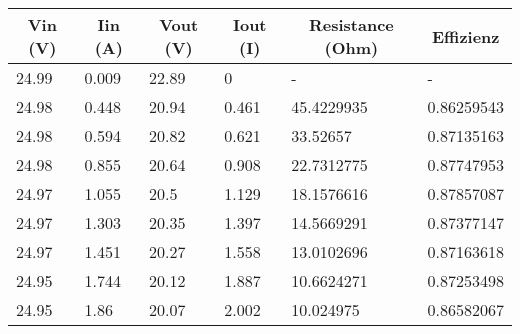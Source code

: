 \begin{table}[h]
\centering

\begin{tabular}{|l|l|l|l|l|l|}
\hline
\multicolumn{1}{|c|}{Vin (V)} & \multicolumn{1}{c|}{Iin (A)} & \multicolumn{1}{c|}{Vout (V)} & \multicolumn{1}{c|}{Iout (I)} & \multicolumn{1}{c|}{Resistance (Ohm)} & \multicolumn{1}{c|}{Effizienz} \\ \hline
24.99                         & 0.009                        & 22.89                         & 0                             & -                                     & -                              \\ \hline
24.98                         & 0.448                        & 20.94                         & 0.461                         & 45.4229935                            & 0.86259543                     \\ \hline
24.98                         & 0.594                        & 20.82                         & 0.621                         & 33.52657                              & 0.87135163                     \\ \hline
24.98                         & 0.855                        & 20.64                         & 0.908                         & 22.7312775                            & 0.87747953                     \\ \hline
24.97                         & 1.055                        & 20.5                          & 1.129                         & 18.1576616                            & 0.87857087                     \\ \hline
24.97                         & 1.303                        & 20.35                         & 1.397                         & 14.5669291                            & 0.87377147                     \\ \hline
24.97                         & 1.451                        & 20.27                         & 1.558                         & 13.0102696                            & 0.87163618                     \\ \hline
24.95                         & 1.744                        & 20.12                         & 1.887                         & 10.6624271                            & 0.87253498                     \\ \hline
24.95                         & 1.86                         & 20.07                         & 2.002                         & 10.024975                             & 0.86582067                     \\ \hline

\end{tabular}
\end{table}

